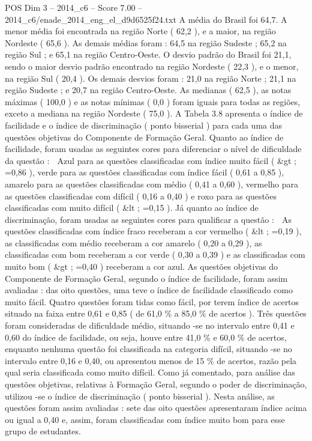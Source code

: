 \begin{textsample}{POS Dim 3 – 2014\_c6 – Score 7.00 – 2014\_c6/enade\_2014\_eng\_el\_d9d6525f24.txt}
A média do Brasil foi 64,7.
A menor média foi encontrada na região Norte ( 62,2 ), e a maior, na região Nordeste ( 65,6 ).
As demais médias foram : 64,5 na região Sudeste ; 65,2 na região Sul ; e 65,1 na região Centro-Oeste.
O desvio padrão do Brasil foi 21,1, sendo o maior desvio padrão encontrado na região Nordeste ( 22,3 ), e o menor, na região Sul ( 20,4 ).
Os demais desvios foram : 21,0 na região Norte ; 21,1 na região Sudeste ; e 20,7 na região Centro-Oeste.
As medianas ( 62,5 ), as notas máximas ( 100,0 ) e as notas mínimas ( 0,0 ) foram iguais para todas as regiões, exceto a mediana na região Nordeste ( 75,0 ).
A Tabela 3.8 apresenta o índice de facilidade e o índice de discriminação ( ponto bisserial ) para cada uma das questões objetivas do Componente de Formação Geral.
Quanto ao índice de facilidade, foram usadas as seguintes cores para diferenciar o nível de dificuldade da questão :  Azul para as questões classificadas com índice muito fácil ( \&gt ; =0,86 ), verde para as questões classificadas com índice fácil ( 0,61 a 0,85 ), amarelo para as questões classificadas com médio ( 0,41 a 0,60 ), vermelho para as questões classificadas com difícil ( 0,16 a 0,40 ) e roxo para as questões classificadas com muito difícil ( \&lt ; =0,15 ).
Já quanto ao índice de discriminação, foram usadas as seguintes cores para qualificar a questão :  As questões classificadas com índice fraco receberam a cor vermelho ( \&lt ; =0,19 ), as classificadas com médio receberam a cor amarelo ( 0,20 a 0,29 ), as classificadas com bom receberam a cor verde ( 0,30 a 0,39 ) e as classificadas com muito bom ( \&gt ; =0,40 ) receberam a cor azul.
As questões objetivas do Componente de Formação Geral, segundo o índice de facilidade, foram assim avaliadas : das oito questões, uma teve o índice de facilidade classificado como muito fácil.
Quatro questões foram tidas como fácil, por terem índice de acertos situado na faixa entre 0,61 e 0,85 ( de 61,0 \% a 85,0 \% de acertos ).
Três questões foram consideradas de dificuldade médio, situando -se no intervalo entre 0,41 e 0,60 do índice de facilidade, ou seja, houve entre 41,0 \% e 60,0 \% de acertos, enquanto nenhuma questão foi classificada na categoria difícil, situando -se no intervalo entre 0,16 e 0,40, ou apresentou menos de 15 \% de acertos, razão pela qual seria classificada como muito difícil.
Como já comentado, para análise das questões objetivas, relativas à Formação Geral, segundo o poder de discriminação, utilizou -se o índice de discriminação ( ponto bisserial ).
Nesta análise, as questões foram assim avaliadas : sete das oito questões apresentaram índice acima ou igual a 0,40 e, assim, foram classificadas com índice muito bom para esse grupo de estudantes.

\end{textsample}
